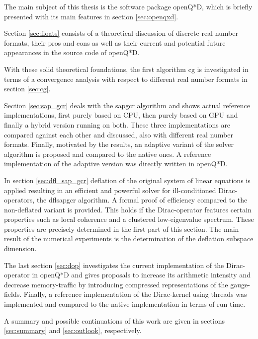 \documentclass{article}
\theoremstyle{plain} %
\theoremstyle{convention} %
\theoremstyle{remark} %
\numberwithin{equation}{section}
\begin{document}
The main subject of this thesis is the software package openQ*D, which is briefly presented with its main features in section \ref{sec:openqxd}.

Section \ref{sec:floats} consists of a theoretical discussion of discrete real number formats, their pros and cons as well as their current and potential future appearances in the source code of openQ*D.

With these solid theoretical foundations, the first algorithm \acrlong{cg} is investigated in terms of a convergence analysis with respect to different real number formats in section \ref{sec:cg}.

Section \ref{sec:sap_gcr} deals with the \acrlong{sapgcr} algorithm and shows actual reference implementations, first purely based on CPU, then purely based on GPU and finally a hybrid version running on both. These three implementations are compared against each other and discussed, also with different real number formats. Finally, motivated by the results, an adaptive variant of the solver algorithm is proposed and compared to the native ones. A reference implementation of the adaptive version was directly written in openQ*D.

In section \ref{sec:dfl_sap_gcr} deflation of the original system of linear equations is applied resulting in an efficient and powerful solver for ill-conditioned Dirac-operators, the \acrlong{dflsapgcr} algorithm. A formal proof of efficiency compared to the non-deflated variant is provided. This holds if the Dirac-operator features certain properties such as local coherence and a clustered low-eigenvalue spectrum. These properties are precisely determined in the first part of this section. The main result of the numerical experiments is the determination of the deflation subspace dimension.

The last section \ref{sec:dop} investigates the current implementation of the Dirac-operator in openQ*D and gives proposals to increase its arithmetic intensity and decrease memory-traffic by introducing compressed representations of the gauge-fields. Finally, a reference implementation of the Dirac-kernel using threads was implemented and compared to the native implementation in terms of run-time.

A summary and possible continuations of this work are given in sections \ref{sec:summary} and \ref{sec:outlook}, respectively.
\end{document}
